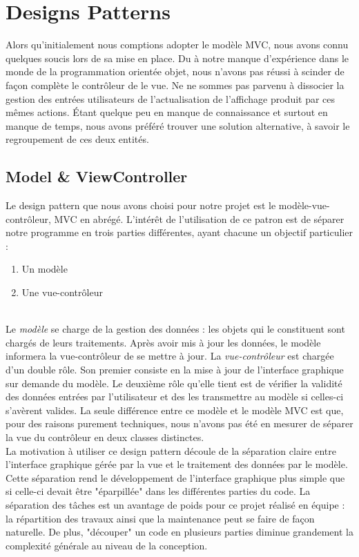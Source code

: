 \newpage
\section{Designs Patterns}
Alors qu'initialement nous comptions adopter le modèle MVC, nous avons connu quelques 
soucis lors de sa mise en place. Du à notre manque d'expérience dans le monde de la  
programmation orientée objet, nous n'avons pas réussi à scinder de façon complète 
le contrôleur de le vue. Ne ne sommes pas parvenu à dissocier la gestion des
entrées utilisateurs de l'actualisation de l'affichage produit par ces mêmes actions.
Étant quelque peu en manque de connaissance et surtout en manque de temps, nous avons
préféré trouver une solution alternative, à savoir le regroupement de ces deux entités.

\subsection{Model \& ViewController}
Le design pattern que nous avons choisi pour notre projet est le modèle-vue-contrôleur, 
MVC en abrégé. L'intérêt de l'utilisation de ce patron est de séparer notre programme 
en trois parties différentes, ayant chacune un objectif particulier :
\begin{enumerate}
\item Un modèle
\item Une vue-contrôleur
\end{enumerate}\ \\
Le \textit{modèle} se charge de la gestion des données : les objets qui le constituent sont 
chargés de leurs traitements. Après avoir mis à jour les données, le modèle informera la  
vue-contrôleur de se mettre à jour. La \textit{vue-contrôleur} est chargée d'un double 
rôle. Son premier consiste en la mise à jour de l'interface graphique sur demande du modèle.
Le deuxième rôle qu'elle tient est de vérifier la validité des données entrées par l'utilisateur
et des les transmettre au modèle si celles-ci s'avèrent valides. La seule différence entre 
ce modèle et le modèle MVC est que, pour des raisons purement techniques, nous n'avons pas été en 
mesurer de séparer la vue du contrôleur en deux classes distinctes.\\

La motivation à utiliser ce design pattern découle de la séparation claire entre 
l'interface graphique gérée par la vue et le traitement des données par le modèle. 
Cette séparation rend le développement de l'interface graphique plus simple que si
celle-ci devait être "éparpillée" dans les différentes parties du code. La 
séparation des tâches est un avantage de poids pour ce projet réalisé en équipe : la
répartition des travaux ainsi que la maintenance peut se faire de façon naturelle. De 
plus, "découper" un code en plusieurs parties diminue grandement la complexité générale 
au niveau de la conception.



